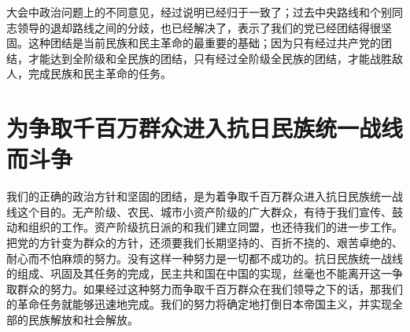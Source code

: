 大会中政治问题上的不同意见，经过说明已经归于一致了；过去中央路线和个别同志领导的退却路线之间的分歧，也已经解决了，表示了我们的党已经团结得很坚固。这种团结是当前民族和民主革命的最重要的基础；因为只有经过共产党的团结，才能达到全阶级和全民族的团结，只有经过全阶级全民族的团结，才能战胜敌人，完成民族和民主革命的任务。

\section{为争取千百万群众进入抗日民族统一战线而斗争}

我们的正确的政治方针和坚固的团结，是为着争取千百万群众进入抗日民族统一战线这个目的。无产阶级、农民、城市小资产阶级的广大群众，有待于我们宣传、鼓动和组织的工作。资产阶级抗日派的和我们建立同盟，也还待我们的进一步工作。把党的方针变为群众的方针，还须要我们长期坚持的、百折不挠的、艰苦卓绝的、耐心而不怕麻烦的努力。没有这样一种努力是一切都不成功的。抗日民族统一战线的组成、巩固及其任务的完成，民主共和国在中国的实现，丝毫也不能离开这一争取群众的努力。如果经过这种努力而争取千百万群众在我们领导之下的话，那我们的革命任务就能够迅速地完成。我们的努力将确定地打倒日本帝国主义，并实现全部的民族解放和社会解放。


